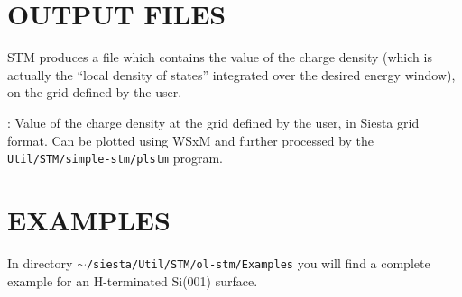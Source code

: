 \section{OUTPUT FILES}
\label{cap:output} 

{\sc STM} produces a file which contains the value
of the charge density (which is actually the ``local density of
states'' integrated over the desired energy window), on the grid
defined by the user. 

\begin{description}
\itemsep 10pt
\parsep 0pt

\item[{\bf {\it SystemLabel}.STM.LDOS}]:
Value of the charge density at the grid defined by the user,
in {\sc Siesta} grid format. Can be plotted using WSxM and further
processed by the {\tt Util/STM/simple-stm/plstm} program.

\end{description}



\section{EXAMPLES}

In directory {\tt $\sim$/siesta/Util/STM/ol-stm/Examples} you will
find a complete example for an H-terminated Si(001) surface.


